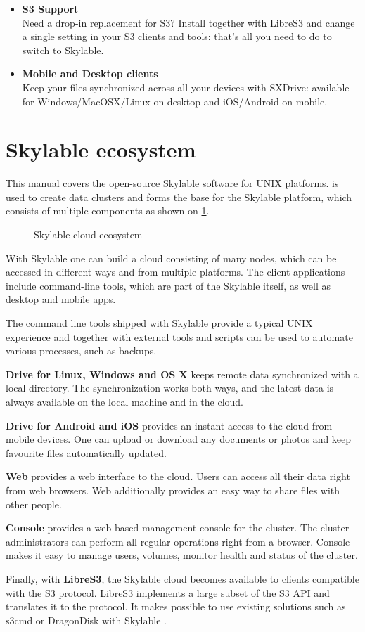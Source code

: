 \begin{itemize}
    \item \textbf{S3 Support}\\
    Need a drop-in replacement for S3? Install \SX together with LibreS3 and
    change a single setting in your S3 clients and tools: that's all you need
    to do to switch to Skylable.

    \item \textbf{Mobile and Desktop clients}\\
    Keep your files synchronized across all your devices with SXDrive: available
    for Windows/MacOSX/Linux on desktop and iOS/Android on mobile.
\end{itemize}

\section{Skylable ecosystem}
This manual covers the open-source Skylable \SX software for UNIX platforms.
\SX is used to create data clusters and forms the base for the Skylable
platform, which consists of multiple components as shown on \ifpdf{}\else\ref{fig:components}.\fi
\begin{figure}
    \centering
    
    \caption{Skylable cloud ecosystem}
    \label{fig:components}
\end{figure}
With Skylable \SX one can build a cloud consisting of many nodes, which can
be accessed in different ways and from multiple platforms. The client
applications include command-line tools, which are part of the Skylable \SX
itself, as well as desktop and mobile apps.

The command line tools shipped with Skylable \SX provide a typical UNIX
experience and together with external tools and scripts can be used to
automate various processes, such as backups.

\textbf{\SX Drive for Linux, Windows and OS X} keeps remote data synchronized with
a local directory. The synchronization works both ways, and the latest data
is always available on the local machine and in the cloud.

\textbf{\SX Drive for Android and iOS} provides an instant access to the cloud from
mobile devices. One can upload or download any documents or photos and keep
favourite files automatically updated.

\textbf{\SX Web} provides a web interface to the cloud. Users can access all their
data right from web browsers. \SX Web additionally provides an easy way to
share files with other people.

\textbf{\SX Console} provides a web-based management console for the cluster. The
cluster administrators can perform all regular operations right from a browser.
\SX Console makes it easy to manage users, volumes, monitor health and status
of the cluster.

Finally, with \textbf{LibreS3}, the Skylable cloud becomes available to clients
compatible with the S3 protocol. LibreS3 implements a large subset of the
S3 API and translates it to the \SX protocol. It makes possible to use
existing solutions such as s3cmd or DragonDisk with Skylable \SX.
